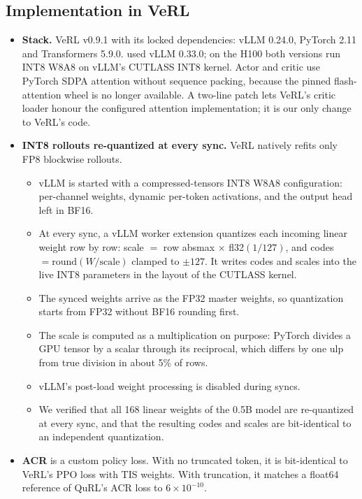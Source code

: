 \subsection{Implementation in VeRL}\label{app:verl}
\begin{itemize}[leftmargin=*,itemsep=2pt]
\item \textbf{Stack.} VeRL v0.9.1 with its locked dependencies: vLLM 0.24.0, PyTorch 2.11 and Transformers 5.9.0.  used vLLM 0.33.0; on the H100 both versions run INT8 W8A8 on vLLM's CUTLASS INT8 kernel. Actor and critic use PyTorch SDPA attention without sequence packing, because the pinned flash-attention wheel is no longer available. A two-line patch lets VeRL's critic loader honour the configured attention implementation; it is our only change to VeRL's code.
\item \textbf{INT8 rollouts re-quantized at every sync.} VeRL natively refits only FP8 blockwise rollouts.
  \begin{itemize}[leftmargin=*,itemsep=1pt]
  \item vLLM is started with a compressed-tensors INT8 W8A8 configuration: per-channel weights, dynamic per-token activations, and the output head left in BF16.
  \item At every sync, a vLLM worker extension quantizes each incoming linear weight row by row: scale $=$ row absmax $\times$ fl32$(1/127)$, and codes $=\mathrm{round}(W/\text{scale})$ clamped to $\pm127$. It writes codes and scales into the live INT8 parameters in the layout of the CUTLASS kernel.
  \item The synced weights arrive as the FP32 master weights, so quantization starts from FP32 without BF16 rounding first.
  \item The scale is computed as a multiplication on purpose: PyTorch divides a GPU tensor by a scalar through its reciprocal, which differs by one ulp from true division in about 5\% of rows.
  \item vLLM's post-load weight processing is disabled during syncs.
  \item We verified that all 168 linear weights of the 0.5B model are re-quantized at every sync, and that the resulting codes and scales are bit-identical to an independent quantization.
  \end{itemize}
\item \textbf{ACR} is a custom policy loss. With no truncated token, it is bit-identical to VeRL's PPO loss with TIS weights. With truncation, it matches a float64 reference of QuRL's ACR loss to $6\times10^{-10}$.

\end{itemize}
